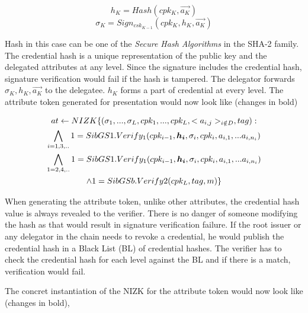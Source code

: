 \documentclass[journal]{IEEEtran}
\begin{document}
$$
h_K = Hash(cpk_K,\overrightarrow{a_K})
$$
$$
\sigma_K = Sign_{csk_{K-1}}(cpk_K,h_K,\overrightarrow{a_K})
$$

Hash in this case can be one of the \textit{Secure Hash Algorithms} in the SHA-2 family. The credential hash is a unique representation of the public key and the delegated attributes at any level. Since the signature includes the credential hash, signature verification would fail if the hash is tampered. The delegator forwards $\sigma_K, h_K, \overrightarrow{a_K}$ to the delegatee. $h_K$ forms a part of credential at every level. The attribute token generated for presentation would now look like (changes in bold)

\begin{multline}
$$
at \leftarrow NIZK \lbrace(\sigma_1,...,\sigma_L,cpk_1,...,cpk_L,<a_{i,j}>_{i \notin D},tag) : \\ 
\bigwedge \limits _{i=1,3,..} 1 = SibGS1.Verify_1(cpk_{i-1}, \boldsymbol{h_i}, \sigma_i,cpk_i,a_{i,1},...a_{i,n_i})\\
\bigwedge \limits _{1=2,4,..} 1 = SibGS1.Verify_1(cpk_{i-1}, \boldsymbol{h_i},\sigma_i,cpk_i,a_{i,1},...a_{i,n_i})\\
\wedge 1 = SibGSb.Verify2(cpk_L,tag,m)\rbrace
$$
\end{multline}

When generating the attribute token, unlike other attributes, the credential hash value is always revealed to the verifier. There is no danger of someone modifying the hash as that would result in signature verification failure. If the root issuer or any delegator in the chain needs to revoke a credential, he would publish the credential hash in a Black List (BL) of credential hashes. The verifier has to check the credential hash for each level against the BL and if there is a match, verification would fail.

The concret instantiation of the NIZK for the attribute token would now look like (changes in bold),
\end{document}
